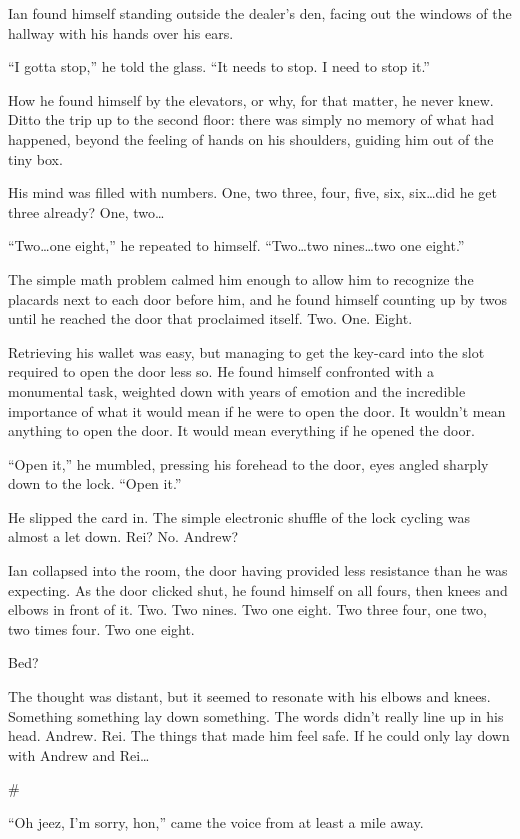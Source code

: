 \documentclass[12pt,letterpaper,oneside]{memoir}
\newcommand\secdiv{
  \begin{center}
    \#
  \end{center}
}
\begin{document}
  Ian found himself standing outside the dealer's den, facing out the windows of the hallway with his hands over his ears.

  ``I gotta stop,'' he told the glass. ``It needs to stop. I need to stop it.''

  How he found himself by the elevators, or why, for that matter, he never knew. Ditto the trip up to the second floor: there was simply no memory of what had happened, beyond the feeling of hands on his shoulders, guiding him out of the tiny box.

  His mind was filled with numbers.  One, two three, four, five, six, six\ldots{}did he get three already?  One, two\ldots{}

  ``Two\ldots{}one eight,'' he repeated to himself. ``Two\ldots{}two nines\ldots{}two one eight.''

  The simple math problem calmed him enough to allow him to recognize the placards next to each door before him, and he found himself counting up by twos until he reached the door that proclaimed itself. Two. One. Eight.

  Retrieving his wallet was easy, but managing to get the key-card into the slot required to open the door less so. He found himself confronted with a monumental task, weighted down with years of emotion and the incredible importance of what it would mean if he were to open the door. It wouldn't mean anything to open the door.  It would mean everything if he opened the door.

  ``Open it,'' he mumbled, pressing his forehead to the door, eyes angled sharply down to the lock. ``Open it.''

  He slipped the card in. The simple electronic shuffle of the lock cycling was almost a let down. Rei? No. Andrew?

  Ian collapsed into the room, the door having provided less resistance than he was expecting. As the door clicked shut, he found himself on all fours, then knees and elbows in front of it. Two. Two nines. Two one eight. Two three four, one two, two times four. Two one eight.

  Bed?

  The thought was distant, but it seemed to resonate with his elbows and knees. Something something lay down something. The words didn't really line up in his head. Andrew. Rei. The things that made him feel safe. If he could only lay down with Andrew and Rei\ldots{}

  \secdiv

  ``Oh jeez, I'm sorry, hon,'' came the voice from at least a mile away.
\end{document}

